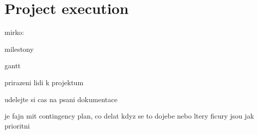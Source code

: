 \chapter{Project execution}

mirko:

milestony

gantt

prirazeni lidi k projektum

udelejte si cas na psani dokumentace

je fajn mit contingency plan, co delat kdyz se to dojebe nebo ltery ficury jsou jak prioritni